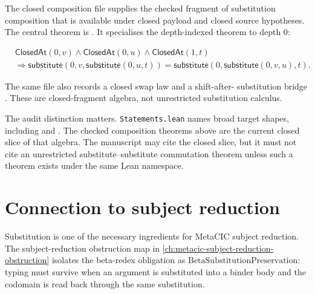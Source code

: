 The closed composition file supplies the checked fragment of substitution
composition that is available under closed payload and closed source
hypotheses. The central theorem is
. It specialises
the depth-indexed theorem
 to
depth $0$:

$$
\begin{aligned}
  &\mathsf{ClosedAt}(0,v)
  \wedge
  \mathsf{ClosedAt}(0,u)
  \wedge
  \mathsf{ClosedAt}(1,t) \\
  &\Rightarrow
  \mathsf{substitute}(0,v,\mathsf{substitute}(0,u,t))
  =
  \mathsf{substitute}(0,\mathsf{substitute}(0,v,u),t).
\end{aligned}
$$

The same file also records a closed swap law
 and a shift-after-
substitution bridge
. These are
closed-fragment algebra, not unrestricted substitution calculus.

The audit distinction matters. \texttt{Statements.lean} names broad target
shapes, including  and
. The checked composition
theorems above are the current closed slice of that algebra. The manuscript
may cite the closed slice, but it must not cite an unrestricted
substitute--substitute commutation theorem unless such a theorem exists under
the same Lean namespace.


\section{Connection to subject reduction}
\label{sec:metacic-substitution-audit-map-subject-reduction}

Substitution is one of the necessary ingredients for MetaCIC subject
reduction. The subject-reduction obstruction map in
\autoref{ch:metacic-subject-reduction-obstruction} isolates the beta-redex
obligation as $\mathrm{BetaSubstitutionPreservation}$: typing must survive
when an argument is substituted into a binder body and the codomain is read
back through the same substitution.

